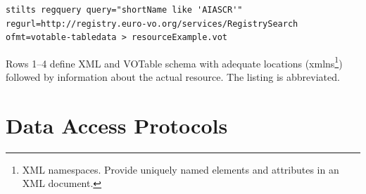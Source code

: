 \begin{lstlisting}[frame=single]
stilts regquery query="shortName like 'AIASCR'"
regurl=http://registry.euro-vo.org/services/RegistrySearch
ofmt=votable-tabledata > resourceExample.vot
\end{lstlisting}

Rows 1--4 define XML and VOTable schema with adequate locations
(xmlns\footnote{XML namespaces. Provide uniquely named elements and
  attributes in an XML document.}) followed by information about the
actual resource. The listing is abbreviated.

  

    

    






\section{Data Access Protocols}

